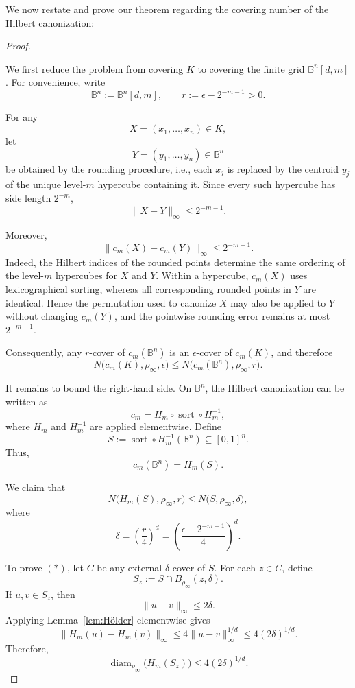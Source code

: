 We now restate and prove our theorem regarding the covering number of the Hilbert canonization:

\hilbert*
\begin{proof}
\label{hilbert_proof}

We first reduce the problem from covering $K$ to covering the finite grid
$\mathbb{B}^n[d,m]$. For convenience, write
\[
    \mathbb{B}^n := \mathbb{B}^n[d,m],
    \qquad
    r := \epsilon - 2^{-m-1} > 0.
\]

For any
\[
    X=(x_1,\ldots,x_n)\in K,
\]
let
\[
    Y=(y_1,\ldots,y_n)\in \mathbb{B}^n
\]
be obtained by the rounding procedure, i.e., each $x_j$ is replaced by
the centroid $y_j$ of the unique level-$m$ hypercube containing it.
Since every such hypercube has side length $2^{-m}$,
\[
    \|X-Y\|_\infty \leq 2^{-m-1}.
\]

Moreover,
\[
    \|c_m(X)-c_m(Y)\|_\infty \leq 2^{-m-1}.
\]
Indeed, the Hilbert indices of the rounded points determine the same
ordering of the level-$m$ hypercubes for $X$ and $Y$. Within a
hypercube, $c_m(X)$ uses lexicographical sorting, whereas all
corresponding rounded points in $Y$ are identical. Hence the
permutation used to canonize $X$ may also be applied to $Y$ without
changing $c_m(Y)$, and the pointwise rounding error remains at most
$2^{-m-1}$.

Consequently, any $r$-cover of $c_m(\mathbb{B}^n)$ is an
$\epsilon$-cover of $c_m(K)$, and therefore
\[
    N\bigl(c_m(K),\rho_\infty,\epsilon\bigr)
    \leq
    N\bigl(c_m(\mathbb{B}^n),\rho_\infty,r\bigr).
\]

It remains to bound the right-hand side. On $\mathbb{B}^n$, the
Hilbert canonization can be written as
\[
    c_m
    =
    H_m \circ \operatorname{sort} \circ H_m^{-1},
\]
where $H_m$ and $H_m^{-1}$ are applied elementwise. Define
\[
    S :=
    \operatorname{sort}\circ H_m^{-1}(\mathbb{B}^n)
    \subseteq [0,1]^n.
\]
Thus,
\[
    c_m(\mathbb{B}^n)=H_m(S).
\]

We claim that
\[
    N\bigl(H_m(S),\rho_\infty,r\bigr)
    \leq
    N\bigl(S,\rho_\infty,\delta\bigr),
    \tag{*}
\]
where
\[
    \delta
    =
    \left(\frac{r}{4}\right)^d
    =
    \left(
        \frac{\epsilon-2^{-m-1}}{4}
    \right)^d.
\]

To prove $(*)$, let $C$ be any external $\delta$-cover of $S$. For
each $z\in C$, define
\[
    S_z := S\cap B_{\rho_\infty}(z,\delta).
\]
If $u,v\in S_z$, then
\[
    \|u-v\|_\infty \leq 2\delta.
\]
Applying Lemma~\ref{lem:Hölder} elementwise gives
\[
    \|H_m(u)-H_m(v)\|_\infty
    \leq
    4\|u-v\|_\infty^{1/d}
    \leq
    4(2\delta)^{1/d}.
\]
Therefore,
\[
    \operatorname{diam}_{\rho_\infty}\bigl(H_m(S_z)\bigr)
    \leq
    4(2\delta)^{1/d}.
\]


\end{proof}
